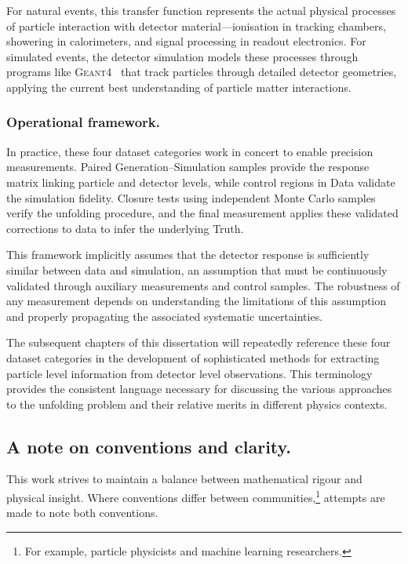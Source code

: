         For natural events, this transfer function represents the actual physical processes of particle interaction with detector material---ionisation in tracking chambers, showering in calorimeters, and signal processing in readout electronics.
        For simulated events, the detector simulation models these processes through programs like \textsc{Geant4}~\cite{allison_recent_2016,Allison:2006ve,GEANT4:2002zbu} that track particles through detailed detector geometries, applying the current best understanding of particle matter interactions.

    \subsubsection{Operational framework.}
        In practice, these four dataset categories work in concert to enable precision measurements.
        Paired Generation--Simulation samples provide the response matrix linking particle and detector levels, while control regions in Data validate the simulation fidelity.
        Closure tests using independent Monte Carlo samples verify the unfolding procedure, and the final measurement applies these validated corrections to data to infer the underlying Truth.

        This framework implicitly assumes that the detector response is sufficiently similar between data and simulation, an assumption that must be continuously validated through auxiliary measurements and control samples.
        The robustness of any measurement depends on understanding the limitations of this assumption and properly propagating the associated systematic uncertainties.

        The subsequent chapters of this dissertation will repeatedly reference these four dataset categories in the development of sophisticated methods for extracting particle level information from detector level observations.
        This terminology provides the consistent language necessary for discussing the various approaches to the unfolding problem and their relative merits in different physics contexts.      
    \subsection{A note on conventions and clarity.}
         This work strives to maintain a balance between mathematical rigour and physical insight.
         Where conventions differ between communities,\footnote{For example, particle physicists and machine learning researchers.} attempts are made to note both conventions.
         
